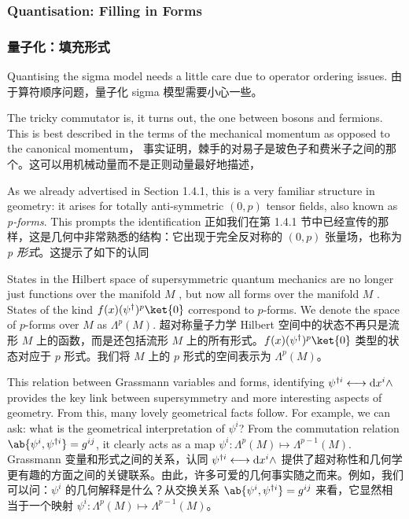 \documentclass{ctexart}
\begin{document}
\begin{paracol}{2}
\subsubsection{Quantisation: Filling in Forms}
\switchcolumn
\subsubsection*{量子化：填充形式}
\switchcolumn*

Quantising the sigma model needs a little care due to operator ordering issues.
\switchcolumn
由于算符顺序问题，量子化 sigma 模型需要小心一些。
\switchcolumn*

The tricky commutator is, it turns out, the one between bosons and fermions. This is best described in the terms of the mechanical momentum as opposed to the canonical momentum，
\switchcolumn
事实证明，棘手的对易子是玻色子和费米子之间的那个。这可以用机械动量而不是正则动量最好地描述，
\switchcolumn*

As we already advertised in Section 1.4.1, this is a very familiar structure in geometry: it arises for totally anti-symmetric $(0, p)$ tensor fields, also known as \textit{p-forms}. This prompts the identification
\switchcolumn
正如我们在第 1.4.1 节中已经宣传的那样，这是几何中非常熟悉的结构：它出现于完全反对称的 $(0, p)$ 张量场，也称为 \textit{p 形式}。这提示了如下的认同
\switchcolumn*

States in the Hilbert space of supersymmetric quantum mechanics are no longer just functions over the manifold $M$ , but now all forms over the manifold $M$ . States of the kind $f(x) (\psi^{\dagger})^{p} \ket{0}$ correspond to $p$-forms. We denote the space of $p$-forms over $M$ as $\Lambda^{p}(M)$.
\switchcolumn
超对称量子力学 Hilbert 空间中的状态不再只是流形 $M$ 上的函数，而是还包括流形 $M$ 上的所有形式。$f(x) (\psi^{\dagger})^{p} \ket{0}$ 类型的状态对应于 $p$ 形式。我们将 $M$ 上的 $p$ 形式的空间表示为 $\Lambda^{p}(M)$。
\switchcolumn*

This relation between Grassmann variables and forms, identifying $\psi^{\dagger i} \longleftrightarrow \odif{x}^i \wedge$ provides the key link between supersymmetry and more interesting aspects of geometry. From this, many lovely geometrical facts follow. For example, we can ask: what is the geometrical interpretation of $\psi^i$? From the commutation relation $\ab\{\psi^i, \psi^{\dagger i}\} = g^{ij}$, it clearly acts as a map $\psi^{i}: \Lambda^p(M) \mapsto \Lambda^{p - 1}(M)$.
\switchcolumn
Grassmann 变量和形式之间的关系，认同 $\psi^{\dagger i} \longleftrightarrow \odif{x}^i \wedge$ 提供了超对称性和几何学更有趣的方面之间的关键联系。由此，许多可爱的几何事实随之而来。例如，我们可以问：$\psi^i$ 的几何解释是什么？从交换关系 $\ab\{\psi^i, \psi^{\dagger i}\} = g^{ij}$ 来看，它显然相当于一个映射 $\psi^{i}: \Lambda^p (M) \mapsto \Lambda^{p - 1}(M)$。
\switchcolumn*


\end{paracol}
\end{document}
